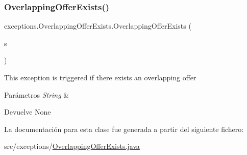 \mbox{\label{classexceptions_1_1_overlapping_offer_exists_a053baab9b6c9e1da073098c4cfbcdc45}} 
\subsubsection{\texorpdfstring{OverlappingOfferExists()}{OverlappingOfferExists()}\hspace{0.1cm}{\footnotesize\ttfamily [2/2]}}
{\footnotesize\ttfamily exceptions.\+Overlapping\+Offer\+Exists.\+Overlapping\+Offer\+Exists (\begin{DoxyParamCaption}\item[{String}]{s }\end{DoxyParamCaption})}

This exception is triggered if there exists an overlapping offer 
\begin{DoxyParams}{Parámetros}
{\em String} & \\
\hline
\end{DoxyParams}
\begin{DoxyReturn}{Devuelve}
None 
\end{DoxyReturn}


La documentación para esta clase fue generada a partir del siguiente fichero\+:\begin{DoxyCompactItemize}
\item 
src/exceptions/\mbox{\hyperlink{_overlapping_offer_exists_8java}{Overlapping\+Offer\+Exists.\+java}}\end{DoxyCompactItemize}
